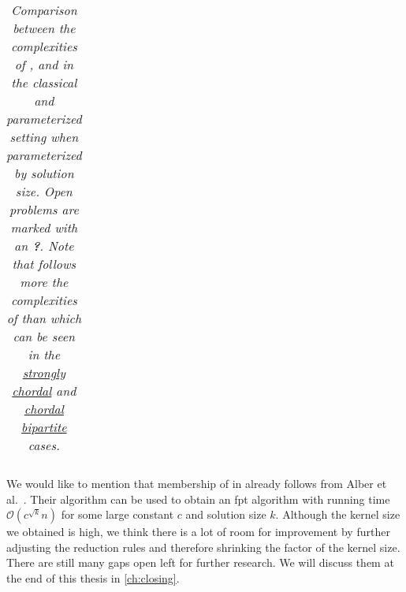 \begin{center}
\begin{table}[t]
\begin{minipage}[th]{\linewidth}
{\begin{tabularx}{1.5\textwidth}{lllllll}
        
        \midrule
        \bottomrule
    \end{tabularx}
}
\end{minipage}
    \caption{\textit{Comparison between the complexities of \dom, \sdom and \tdom in the classical and parameterized setting when parameterized by solution size. 
    Open problems are marked with an \textbf{?}.
    Note that \sdom follows more the complexities of \dom than \tdom which can be seen in the \underline{strongly chordal} and \underline{chordal bipartite} cases.}}\label{tab:complexities}
    \end{table}
\end{center}


We would like to mention that membership of \psdom in \FPT already follows from Alber et al.~\cite{Alber2002}.
Their algorithm \pdomp can be used to obtain an fpt algorithm with running time $\mathcal{O}(c^{\sqrt{k}}n)$ for some large constant $c$ and solution size $k$.
Although the kernel size we obtained is high, we think there is a lot of room for improvement by further adjusting the reduction rules and therefore shrinking the factor of the kernel size.
There are still many gaps open left for further research.
We will discuss them at the end of this thesis in \cref{ch:closing}.



